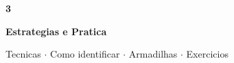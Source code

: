 \documentclass[aspectratio=169,10pt]{beamer}
\begin{document}
{
\begin{frame}[noframenumbering]
  \centering\vspace{1.0cm}
  {\fontsize{36}{44}\selectfont\bfseries\color{gemaBlue} 3}\par
  \vspace{0.25cm}
  {\Large\color{greedyGold}\bfseries Estrategias e Pratica}\par
  \vspace{0.15cm}
  {\color{gray}\small Tecnicas $\cdot$ Como identificar $\cdot$ Armadilhas $\cdot$ Exercicios}
\end{frame}
}

\end{document}
